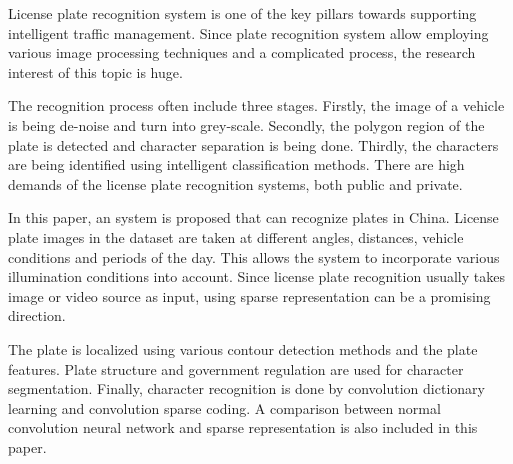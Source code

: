 
License plate recognition system is one of the key pillars towards supporting 
intelligent traffic management. Since plate recognition system allow employing
various image processing techniques and a complicated process, the research interest
of this topic is huge.

The recognition process often include three stages. Firstly, the image of a vehicle 
is being de-noise and turn into grey-scale. Secondly, the polygon region of the 
plate is detected and character separation is being done. Thirdly, the characters
are being identified using intelligent classification methods. There are high 
demands of the license plate recognition systems, both public and private. 

In this paper, an system is proposed that can recognize plates in China. 
License plate images in the dataset are taken at different angles, distances, 
vehicle conditions and periods of the day. This allows the system to incorporate
various illumination conditions into account. Since license plate recognition 
usually takes image or video source as input, using sparse representation can 
be a promising direction. 

The plate is localized using various contour detection methods and the plate features. 
Plate structure and government regulation are used for character segmentation. 
Finally, character recognition is done by convolution dictionary learning and 
convolution sparse coding. A comparison between normal convolution neural network 
and sparse representation is also included in this paper.